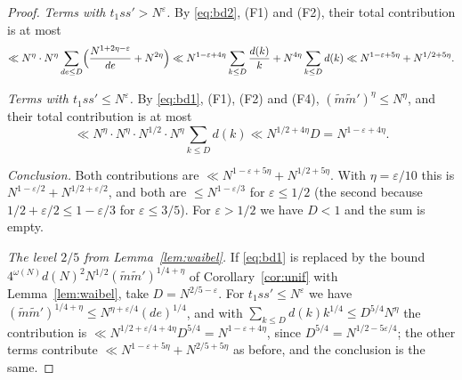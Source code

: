 \documentclass[11pt]{amsart}
\theoremstyle{remark}
\newcommand{\e}{\varepsilon}
\begin{document}
\begin{proof}
\emph{Terms with $t_1ss'>N^\e$.} By \eqref{eq:bd2}, (F1) and (F2), their total contribution is at most
\[
\ll N^{\eta}\cdot N^{\eta}\sum_{de\le D}\Bigl(\frac{N^{1+2\eta-\e}}{de}+N^{2\eta}\Bigr)
\ll N^{1-\e+4\eta}\sum_{k\le D}\frac{d(k)}{k}+N^{4\eta}\sum_{k\le D}d(k)
\ll N^{1-\e+5\eta}+N^{1/2+5\eta}.
\]

\emph{Terms with $t_1ss'\le N^\e$.} By \eqref{eq:bd1}, (F1), (F2) and (F4), $(\tilde m\tilde m')^{\eta}\le N^{\eta}$, and their total contribution is at most
\[
\ll N^{\eta}\cdot N^{\eta}\cdot N^{1/2}\cdot N^{\eta}\sum_{k\le D}d(k)
\ll N^{1/2+4\eta}D=N^{1-\e+4\eta}.
\]

\emph{Conclusion.} Both contributions are $\ll N^{1-\e+5\eta}+N^{1/2+5\eta}$. With $\eta=\e/10$ this is $N^{1-\e/2}+N^{1/2+\e/2}$, and both are $\le N^{1-\e/3}$ for $\e\le1/2$ (the second because $1/2+\e/2\le1-\e/3$ for $\e\le3/5$). For $\e>1/2$ we have $D<1$ and the sum is empty.

\emph{The level $2/5$ from Lemma~\ref{lem:waibel}.} If \eqref{eq:bd1} is replaced by the bound $4^{\omega(N)}d(N)^2N^{1/2}(\tilde m\tilde m')^{1/4+\eta}$ of Corollary~\ref{cor:unif} with Lemma~\ref{lem:waibel}, take $D=N^{2/5-\e}$. For $t_1ss'\le N^\e$ we have $(\tilde m\tilde m')^{1/4+\eta}\le N^{\eta+\e/4}(de)^{1/4}$, and with $\sum_{k\le D}d(k)k^{1/4}\le D^{5/4}N^\eta$ the contribution is $\ll N^{1/2+\e/4+4\eta}D^{5/4}=N^{1-\e+4\eta}$, since $D^{5/4}=N^{1/2-5\e/4}$; the other terms contribute $\ll N^{1-\e+5\eta}+N^{2/5+5\eta}$ as before, and the conclusion is the same.
\end{proof}
\end{document}
